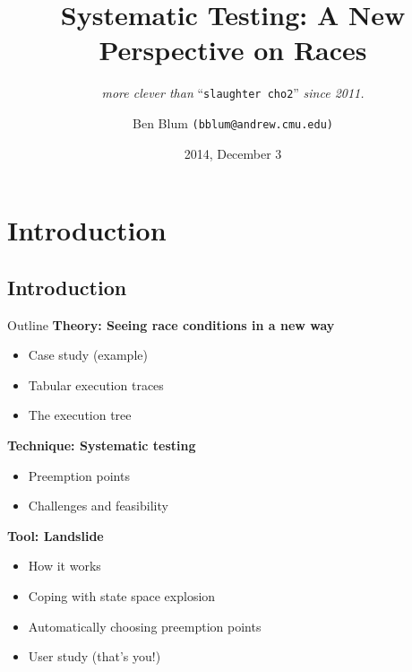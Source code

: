 \documentclass[xcolor=dvipsnames]{beamer}
\title[Landslide]{{\bf Systematic Testing: A New Perspective on Races}}
\subtitle[]{ {\em more clever than } ``\texttt{slaughter cho2}'' {\em since 2011.}}
\author[Ben Blum]{Ben Blum \texttt{(bblum@andrew.cmu.edu)}}
\institute[CMU 15-410]{Carnegie Mellon University - 15-410}
\date[]{2014, December 3}
\begin{document}
\normalem
\begin{frame}
	\titlepage
\end{frame}


\newcommand\linegap{\vspace{0.2in}}
\newcommand\breakslide[1]{\begin{frame}{} \begin{center} #1 \end{center} \end{frame}}

\section{Introduction}
\subsection{Introduction}

\begin{frame}{Outline}
	\textbf{Theory: Seeing race conditions in a new way}
	\begin{itemize}
		\item Case study (example)
		\item Tabular execution traces
		\item The execution tree
	\end{itemize}
	{\bf Technique: Systematic testing}
	\begin{itemize}
		\item Preemption points
		\item Challenges and feasibility
	\end{itemize}
	{\bf Tool: Landslide}
	\begin{itemize}
		\item How it works
		\item Coping with state space explosion
		\item Automatically choosing preemption points
		\item User study (that's you!)
	\end{itemize}
\end{frame}
\end{document}
